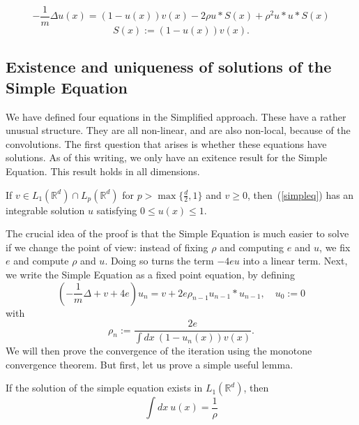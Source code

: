 \documentclass{ian}
\begin{document}
  \begin{equation}
    -\frac1m\Delta u(x)=(1-u(x))v(x)-2\rho u\ast S(x)+\rho^2u\ast u\ast S(x)
    \label{medeq}
  \end{equation}
  \nopagebreakaftereq
  \begin{equation}
    S(x):=(1-u(x))v(x)
    .
  \end{equation}
\endtheo
\restorepagebreakaftereq

\subsection{Existence and uniqueness of solutions of the Simple Equation}
\indent
We have defined four equations in the Simplified approach.
These have a rather unusual structure.
They are all non-linear, and are also non-local, because of the convolutions.
The first question that arises is whether these equations have solutions.
As of this writing, we only have an exitence result for the Simple Equation.
This result holds in all dimensions.
\bigskip

\label{theo:existence}
  If $v\in L_1(\mathbb R^d)\cap L_p(\mathbb R^d)$ for $p>\max\{\frac d2,1\}$ and $v\geqslant 0$, then\-~(\ref{simpleq}) has an integrable solution $u$ satisfying $0\leqslant u(x)\leqslant 1$.
\endtheo
\bigskip

\indent
The crucial idea of the proof is that the Simple Equation is much easier to solve if we change the point of view: instead of fixing $\rho$ and computing $e$ and $u$, we fix $e$ and compute $\rho$ and $u$.
Doing so turns the term $-4eu$ into a linear term.
Next, we write the Simple Equation as a fixed point equation, by defining
\begin{equation}
  \left(-\frac1m\Delta+v+4e\right)u_n=v+2e\rho_{n-1} u_{n-1}\ast u_{n-1}
  ,\quad
  u_0:=0
\end{equation}
with
\begin{equation}
  \rho_n:=\frac{2e}{\int dx\ (1-u_n(x))v(x)}
  .
\end{equation}
We will then prove the convergence of the iteration using the monotone convergence theorem.
But first, let us prove a simple useful lemma.
\bigskip

\label{lemma:intu}
  If the solution of the simple equation exists in $L_1(\mathbb R^d)$, then
  \nopagebreakaftereq
  \begin{equation}
    \int dx\ u(x)=\frac1\rho
  \end{equation}
\endtheo
\restorepagebreakaftereq
\bigskip
\end{document}
